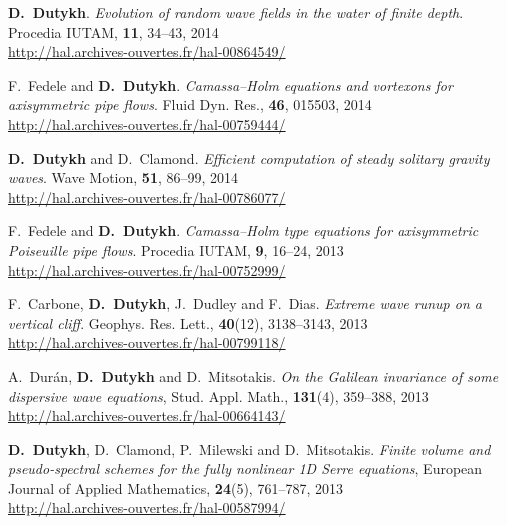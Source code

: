\documentclass[final, a4paper, oneside, 12pt]{article}
\numberwithin{equation}{section}
\begin{document}
\begin{etaremune}
  \item \textbf{D.~Dutykh}. \textit{Evolution of random wave fields in the water of finite depth}. Procedia IUTAM, \textbf{11}, 34--43, 2014 \\ %
  \url{http://hal.archives-ouvertes.fr/hal-00864549/}
  
  \item F.~Fedele and \textbf{D.~Dutykh}. \textit{Camassa--Holm equations and vortexons for axisymmetric pipe flows}. Fluid Dyn. Res., \textbf{46}, 015503, 2014 \\ %
  \url{http://hal.archives-ouvertes.fr/hal-00759444/}

  \item \textbf{D.~Dutykh} and D.~Clamond. \textit{Efficient computation of steady solitary gravity waves}. Wave Motion, \textbf{51}, 86--99, 2014 \\ %
  \url{http://hal.archives-ouvertes.fr/hal-00786077/}


  \item F.~Fedele and \textbf{D.~Dutykh}. \textit{Camassa--Holm type equations for axisymmetric Poiseuille pipe flows}. Procedia IUTAM, \textbf{9}, 16--24, 2013 \\ %
  \url{http://hal.archives-ouvertes.fr/hal-00752999/}

  \item F.~Carbone, \textbf{D.~Dutykh}, J.~Dudley and F.~Dias. \textit{Extreme wave runup on a vertical cliff}. Geophys. Res. Lett., \textbf{40}(12), 3138--3143, 2013 \\ %
  \url{http://hal.archives-ouvertes.fr/hal-00799118/}

  \item A.~Dur\'an, \textbf{D.~Dutykh} and D.~Mitsotakis. \textit{On the Galilean invariance of some dispersive wave equations}, Stud. Appl. Math., \textbf{131}(4), 359--388, 2013 \\ %
  \url{http://hal.archives-ouvertes.fr/hal-00664143/}

  \item \textbf{D.~Dutykh}, D.~Clamond, P.~Milewski and D.~Mitsotakis. \textit{Finite volume and pseudo-spectral schemes for the fully nonlinear 1D Serre equations}, European Journal of Applied Mathematics, \textbf{24}(5), 761--787, 2013 \\ %
  \url{http://hal.archives-ouvertes.fr/hal-00587994/}
  

\end{etaremune}
\end{document}

